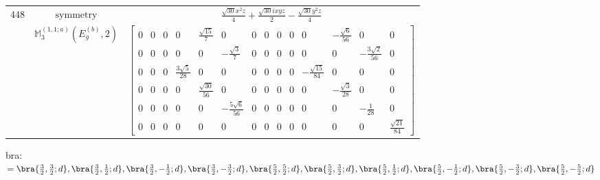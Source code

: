 \documentclass[fleqn,8pt,landscape]{jsarticle}
\begin{document}
\begin{longtable}{ccc}
$ 448 $ & $ \text{symmetry} $ & $ \frac{\sqrt{30} x^{2} z}{4} + \frac{\sqrt{30} i x y z}{2} - \frac{\sqrt{30} y^{2} z}{4} $ \\
$  $ & $ \mathbb{M}_{3}^{(1,1;a)}(E_{g}^{(b)},2) $ & $ \begin{bmatrix} 0 & 0 & 0 & 0 & \frac{\sqrt{15}}{7} & 0 & 0 & 0 & 0 & 0 & 0 & - \frac{\sqrt{6}}{56} & 0 & 0 \\ 0 & 0 & 0 & 0 & 0 & - \frac{\sqrt{3}}{7} & 0 & 0 & 0 & 0 & 0 & 0 & - \frac{3 \sqrt{2}}{56} & 0 \\ 0 & 0 & 0 & \frac{3 \sqrt{5}}{28} & 0 & 0 & 0 & 0 & 0 & 0 & - \frac{\sqrt{15}}{84} & 0 & 0 & 0 \\ 0 & 0 & 0 & 0 & \frac{\sqrt{30}}{56} & 0 & 0 & 0 & 0 & 0 & 0 & - \frac{\sqrt{3}}{28} & 0 & 0 \\ 0 & 0 & 0 & 0 & 0 & - \frac{5 \sqrt{6}}{56} & 0 & 0 & 0 & 0 & 0 & 0 & - \frac{1}{28} & 0 \\ 0 & 0 & 0 & 0 & 0 & 0 & 0 & 0 & 0 & 0 & 0 & 0 & 0 & \frac{\sqrt{21}}{84} \end{bmatrix} $ \\ \hline
\end{longtable}
bra: $=\bra{\frac{3}{2},\frac{3}{2};d}, \bra{\frac{3}{2},\frac{1}{2};d}, \bra{\frac{3}{2},- \frac{1}{2};d}, \bra{\frac{3}{2},- \frac{3}{2};d}, \bra{\frac{5}{2},\frac{5}{2};d}, \bra{\frac{5}{2},\frac{3}{2};d}, \bra{\frac{5}{2},\frac{1}{2};d}, \bra{\frac{5}{2},- \frac{1}{2};d}, \bra{\frac{5}{2},- \frac{3}{2};d}, \bra{\frac{5}{2},- \frac{5}{2};d}$
\end{document}
